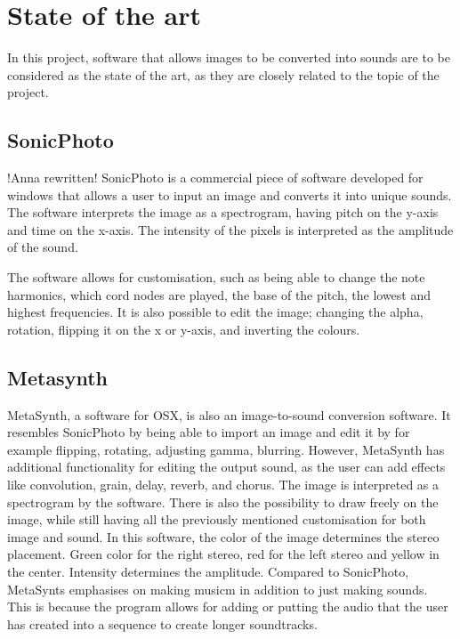 \section{State of the art}\label{sec:stateart}
In this project, software that allows images to be converted into sounds are to be considered as the state of the art, as they are closely related to the topic of the project.

\subsection{SonicPhoto}\label{sub:sonic}
!Anna rewritten!
SonicPhoto \cite{White2013} is a commercial piece of software developed for windows that allows a user to input an image and converts it into unique sounds. The software interprets the image as a spectrogram, having pitch on the y-axis and time on the x-axis. The intensity of the pixels is interpreted as the amplitude of the sound. 

The software allows for customisation, such as being able to change the note harmonics, which cord nodes are played, the base of the pitch, the lowest and highest frequencies. It is also possible to edit the image; changing the alpha, rotation, flipping it on the x or y-axis, and inverting the colours. 


\subsection{Metasynth}\label{sub:metasynth}
MetaSynth, a software for OSX, is also an image-to-sound conversion software. It resembles SonicPhoto by being able to import an image and edit it by for example flipping, rotating, adjusting gamma, blurring. However, MetaSynth has additional functionality for editing the output sound, as the user can add effects like  convolution, grain, delay, reverb, and chorus. The image is interpreted as a spectrogram by the software.
There is also the possibility to draw freely on the image, while still having all the previously mentioned customisation for both image and sound. In this software, the color of the image determines the stereo placement. Green color for the right stereo, red for the left stereo and yellow in the center. Intensity determines the amplitude. 
Compared to SonicPhoto, MetaSynts emphasises on making musicm in addition to just making sounds. This is because the program allows for adding or putting the audio that the user has created into a sequence to create longer soundtracks.